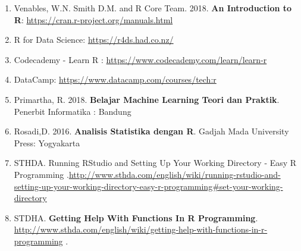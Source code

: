 \documentclass[
]{book}
\providecommand{\tightlist}{%
  \setlength{\itemsep}{0pt}\setlength{\parskip}{0pt}}
\begin{document}
\begin{enumerate}
\def\labelenumi{\arabic{enumi}.}
\tightlist
\item
  Venables, W.N. Smith D.M. and R Core Team. 2018. \textbf{An Introduction to R}: \url{https://cran.r-project.org/manuals.html}
\item
  R for Data Science: \url{https://r4ds.had.co.nz/}
\item
  Codecademy - Learn R : \url{https://www.codecademy.com/learn/learn-r}
\item
  DataCamp: \url{https://www.datacamp.com/courses/tech:r}
\item
  Primartha, R. 2018. \textbf{Belajar Machine Learning Teori dan Praktik}. Penerbit Informatika : Bandung
\item
  Rosadi,D. 2016. \textbf{Analisis Statistika dengan R}. Gadjah Mada University Press: Yogyakarta
\item
  STHDA. Running RStudio and Setting Up Your Working Directory - Easy R Programming .\url{http://www.sthda.com/english/wiki/running-rstudio-and-setting-up-your-working-directory-easy-r-programming\#set-your-working-directory}
\item
  STDHA. \textbf{Getting Help With Functions In R Programming}. \url{http://www.sthda.com/english/wiki/getting-help-with-functions-in-r-programming} .
\end{enumerate}

  
\end{document}
